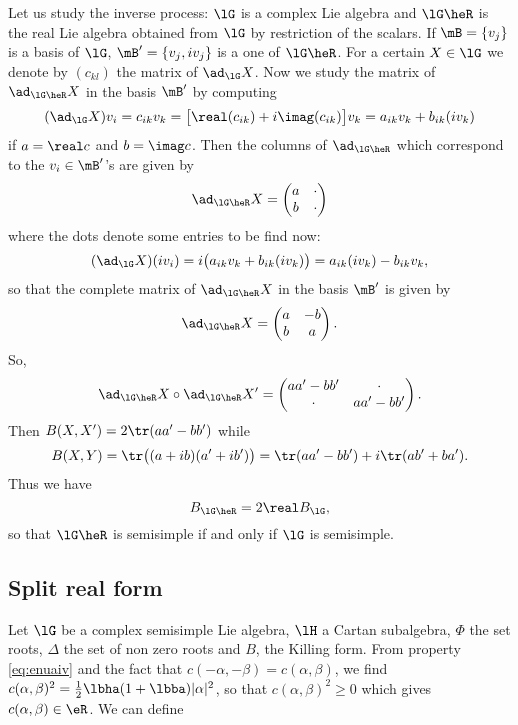 Let us study the inverse process: $\lG$ is a complex Lie algebra and $\lG\heR$ is the real Lie algebra obtained from $\lG$ by restriction of the scalars. If $\mB=\{v_j\}$ is a basis of $\lG$, $\mB'=\{v_j,iv_j\}$ is a one of $\lG\heR$. For a certain $X\in\lG$ we denote by $(c_{kl})$ the matrix of $\ad_{\lG}X$. Now we study the matrix of $\ad_{\lG\heR}X$ in the basis $\mB'$ by computing
\begin{equation}
	(\ad_{\lG}X)v_i=c_{ik}v_k
	=\big[ \real(c_{ik})+i\imag(c_{ik}) \big]v_k
	=a_{ik}v_k+b_{ik}(iv_k)
\end{equation}
if $a=\real c$ and $b=\imag c$. Then the columns of $\ad_{\lG\heR}$ which correspond to the $v_i\in\mB'$'s are given by
\[
	\ad_{\lG\heR}X=\begin{pmatrix}
		a & \cdot \\
		b & \cdot
	\end{pmatrix}
\]
where the dots denote some entries to be find now:
\begin{equation}
	(\ad_{\lG}X)(iv_i)=i\big(  a_{ik}v_k+b_{ik}(iv_k)  \big)\\
	=a_{ik}(iv_k)-b_{ik}v_k,
\end{equation}
so that the complete matrix of $\ad_{\lG\heR}X$ in the basis $\mB'$ is given by
\[
	\ad_{\lG\heR}X=\begin{pmatrix}
		a & -b \\
		b & a
	\end{pmatrix}.
\]
So,
\[
	\ad_{\lG\heR}X\circ\ad_{\lG\heR}X'=\begin{pmatrix}
		aa'-bb' & \cdot   \\
		\cdot   & aa'-bb'
	\end{pmatrix}.
\]
Then $B(X,X')=2\tr(aa'-bb')$ while
\begin{equation}
	B(X,Y)=\tr\big(  (a+ib)(a'+ib')  \big)\\
	=\tr(aa'-bb')+i\tr(ab'+ba').
\end{equation}
Thus we have
\begin{equation}
	B_{\lG\heR}=2\real B_{\lG},
\end{equation}
so that $\lG\heR$ is semisimple if and only if $\lG$ is semisimple.

\subsection{Split real form}

Let $\lG$ be a complex semisimple Lie algebra, $\lH$ a Cartan subalgebra, $\Phi$ the set roots, $\Delta$ the set of non zero roots and $B$, the Killing form. From property \eqref{eq:enuaiv} and the fact that $c(-\alpha,-\beta)=c(\alpha,\beta)$, we find $c(\alpha,\beta)^2=\frac{1}{2}\lbha(1+\lbba)|\alpha|^2$,
so that $c(\alpha,\beta)^2\geq 0$ which gives $c(\alpha,\beta)\in\eR$. We can define

